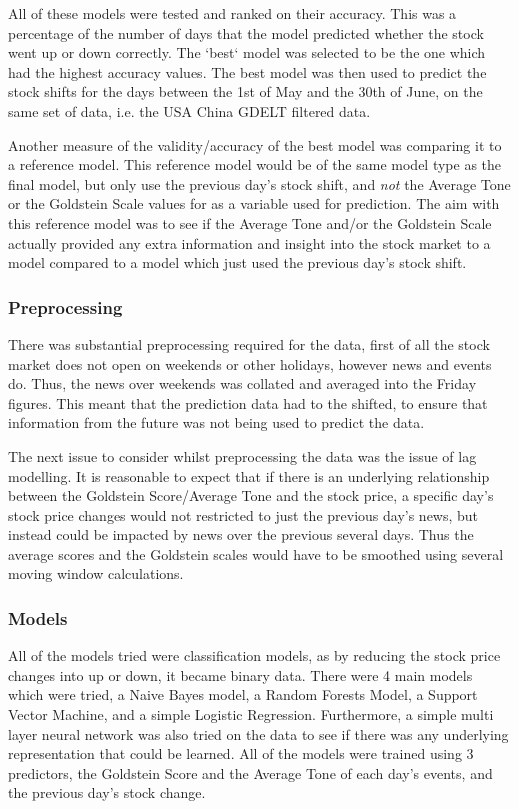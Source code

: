 All of these models were tested and ranked on their accuracy. This was a percentage of the number of days that the model predicted whether the stock went up or down correctly. The `best` model was selected to be the one which had the highest accuracy values. The best model was then used to predict the stock shifts for the days between the 1st of May and the 30th of June, on the same set of data, i.e. the USA China GDELT filtered data. 

Another measure of the validity/accuracy of the best model was comparing it to a reference model. This reference model would be of the same model type as the final model, but only use the previous day's stock shift, and \textit{not} the Average Tone or the Goldstein Scale values for as a variable used for prediction. The aim with this reference model was to see if the Average Tone and/or the Goldstein Scale actually provided any extra information and insight into the stock market to a model compared to a model which just used the previous day's stock shift.  

\subsubsection{Preprocessing}
There was substantial preprocessing required for the data, first of all the stock market does not open on weekends or other holidays, however news and events do. Thus, the news over weekends was collated and averaged into the Friday figures. This meant that the prediction data had to the shifted, to ensure that information from the future was not being used to predict the data.

The next issue to consider whilst preprocessing the data was the issue of lag modelling. It is reasonable to expect that if there is an underlying relationship between the Goldstein Score/Average Tone and the stock price, a specific day's stock price changes would not restricted to just the previous day's news, but instead could be impacted by news over the previous several days. Thus the average scores and the Goldstein scales would have to be smoothed using several moving window calculations.

\subsubsection{Models}
\label{models}
All of the models tried were classification models, as by reducing the stock price changes into up or down, it became binary data. There were 4 main models which were tried, a Naive Bayes model, a Random Forests Model, a Support Vector Machine, and a simple Logistic Regression. Furthermore, a simple multi layer neural network was also tried on the data to see if there was any underlying representation that could be learned. All of the models were trained using 3 predictors, the Goldstein Score and the Average Tone of each day's events, and the previous day's stock change. 

